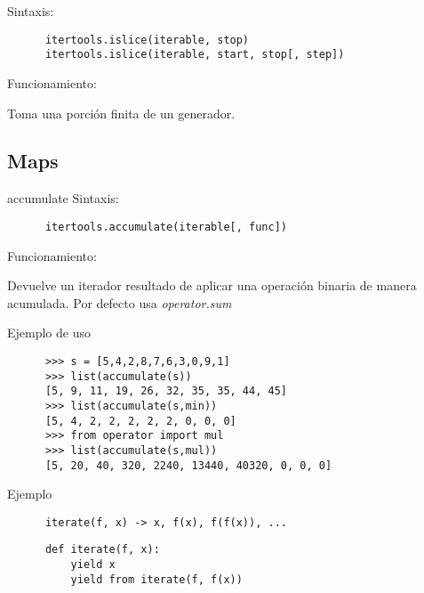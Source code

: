 \documentclass[spanish]{beamer}
\begin{document}
  \begin{frame}[fragile]

    Sintaxis:
    
    \begin{lstlisting}
      itertools.islice(iterable, stop)
      itertools.islice(iterable, start, stop[, step])
    \end{lstlisting}

    Funcionamiento:

    Toma una porción finita de un generador.
    
  \end{frame}

  \subsection{Maps}

  \begin{frame}[fragile]{accumulate}
    Sintaxis:

    \begin{lstlisting}
      itertools.accumulate(iterable[, func])
    \end{lstlisting}

    Funcionamiento:

    Devuelve un iterador resultado de aplicar una operación binaria de
    manera acumulada. Por defecto usa \textit{operator.sum}
    
  \end{frame}

  \begin{frame}[fragile]{Ejemplo de uso}

    
    
    \begin{lstlisting}
      >>> s = [5,4,2,8,7,6,3,0,9,1]
      >>> list(accumulate(s))
      [5, 9, 11, 19, 26, 32, 35, 35, 44, 45]
      >>> list(accumulate(s,min))
      [5, 4, 2, 2, 2, 2, 2, 0, 0, 0]
      >>> from operator import mul
      >>> list(accumulate(s,mul))
      [5, 20, 40, 320, 2240, 13440, 40320, 0, 0, 0]
    \end{lstlisting}
    
  \end{frame}

  \begin{frame}[fragile]{Ejemplo}
    \begin{lstlisting}
      iterate(f, x) -> x, f(x), f(f(x)), ...
    \end{lstlisting}

    \begin{lstlisting}
      def iterate(f, x):
          yield x
          yield from iterate(f, f(x))
    \end{lstlisting}
        
  \end{frame}
\end{document}
